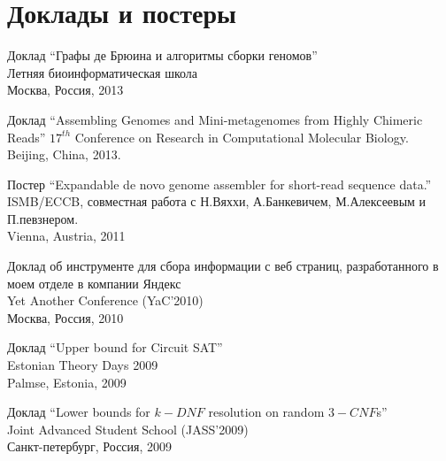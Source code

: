 \section{Доклады и постеры}
\begin{innerlist}
 \item Доклад ``Графы де Брюина и алгоритмы сборки геномов''\\
       Летняя биоинформатическая школа\\
       Москва, Россия, 2013
 \item Доклад ``Assembling Genomes and Mini-metagenomes from Highly Chimeric Reads''
       $17^{th}$ Conference on Research in Computational Molecular Biology.\\ 
       Beijing, China, 2013.
 \item Постер ``Expandable de novo genome assembler for short-read sequence data.''\\
       ISMB/ECCB, совместная работа с Н.Вяххи, А.Банкевичем, М.Алексеевым и П.певзнером.\\ 
       Vienna, Austria, 2011
 \item Доклад об инструменте для сбора информации с веб страниц, разработанного в моем отделе в компании Яндекс\\
       Yet Another Conference (YaC'2010)\\
       Москва, Россия, 2010
 \item Доклад ``Upper bound for Circuit SAT''\\
       Estonian Theory Days 2009\\
       Palmse, Estonia, 2009
 \item Доклад ``Lower bounds for $k-DNF$ resolution on random $3-CNF$s''\\
       Joint Advanced Student School (JASS'2009)\\
       Санкт-петербург, Россия, 2009
\end{innerlist}
